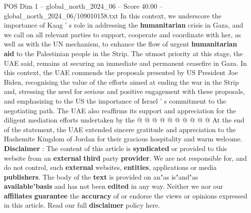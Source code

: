 \begin{textsample}{POS Dim 1 – global\_north\_2024\_06 – Score 40.00 – global\_north\_2024\_06/109010158.txt}
In this context, we underscore the importance of Kaag ' s role in addressing the \textbf{humanitarian} crisis in Gaza, and we call on all relevant parties to support, cooperate and coordinate with her, as well as with the UN mechanism, to enhance the flow of urgent \textbf{humanitarian} \textbf{aid} to the Palestinian people in the Strip.
The utmost priority at this stage, the UAE said, remains at securing an immediate and permanent ceasefire in Gaza.
In this context, the UAE commends the proposals presented by US President Joe Biden, recognising the value of the efforts aimed at ending the war in the Strip and, stressing the need for serious and positive engagement with these proposals, and emphasizing to the US the importance of Israel ' s commitment to the negotiating path.
The UAE also reaffirms its support and appreciation for the diligent mediation efforts undertaken by the @ @ @ @ @ @ @ @ @ @ At the end of the statement, the UAE extended sincere gratitude and appreciation to the Hashemite Kingdom of Jordan for their gracious hospitality and warm welcome. \textbf{Disclaimer} : The content of this article is \textbf{syndicated} or provided to this website from an \textbf{external} \textbf{third} party \textbf{provider}.
We are not responsible for, and do not control, such \textbf{external} websites, \textbf{entities}, applications or media \textbf{publishers}.
The body of the \textbf{text} is provided on an"as is"and"as \textbf{available}"\textbf{basis} and has not been \textbf{edited} in any way.
Neither we nor our \textbf{affiliates} \textbf{guarantee} the \textbf{accuracy} of or endorse the views or opinions expressed in this article.
Read our full \textbf{disclaimer} policy here.

\end{textsample}
